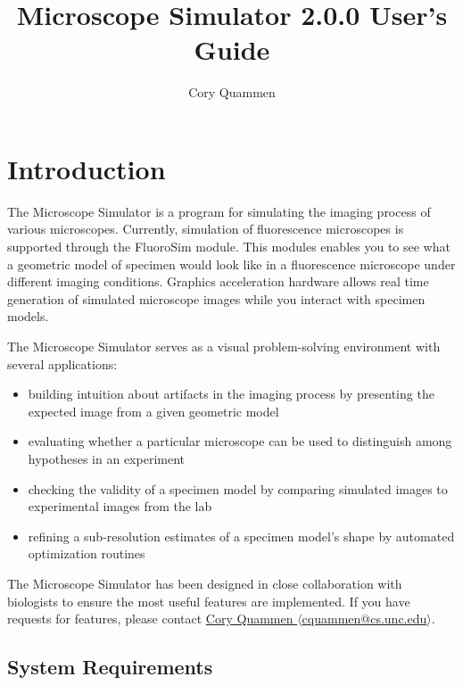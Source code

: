 \documentclass[11pt,titlepage,twoside]{article}
\title{Microscope Simulator 2.0.0 User's Guide}
\author{Cory Quammen}
\begin{document}
\maketitle
\tableofcontents

\pagebreak

\section{Introduction}

The Microscope Simulator is a program for simulating the imaging process of various microscopes. Currently, simulation of fluorescence microscopes is supported through the FluoroSim module. This modules enables you to see what a geometric model of specimen would look like in a fluorescence microscope under different imaging conditions. Graphics acceleration hardware allows real time generation of simulated microscope images while you interact with specimen models.

The Microscope Simulator serves as a visual problem-solving environment with several applications:

\begin{itemize}

\item building intuition about artifacts in the imaging process by presenting the expected image from a given geometric model

\item evaluating whether a particular microscope can be used to distinguish among hypotheses in an experiment

\item checking the validity of a specimen model by comparing simulated images to experimental images from the lab

\item refining a sub-resolution estimates of a specimen model's shape by automated optimization routines

\end{itemize}

The Microscope Simulator has been designed in close collaboration with biologists to ensure the most useful features are implemented. If you have requests for features, please contact  \href{mailto:cquammen@cs.unc.edu}{Cory Quammen $\langle$cquammen@cs.unc.edu$\rangle$}.


\subsection{System Requirements}
\end{document}
